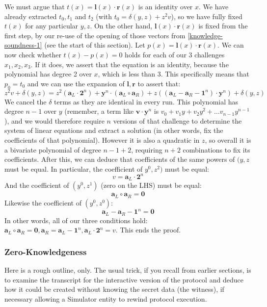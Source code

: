 \documentclass[10pt,a4paper]{article}
\begin{document}
We must argue that $t(x) = \textbf{l}(x) \cdot \textbf{r}(x)$ is an identity over $x$. We have already extracted $t_0, t_1$ and $t_2$
(with $t_0 = \delta(y, z) + z^2v$), so we have fully fixed $t(x)$ for any particular $y,z$. On the other hand, $\textbf{l}(x) \cdot \textbf{r}(x)$
is fixed from the first step, by our re-use of the opening of those
vectors from \ref{knowledge-soundness-1} (see the start of this section). Let $p(x) = \textbf{l}(x) \cdot \textbf{r}(x)$. We can now
check whether $t(x) -p(x) = 0$ holds for each of our 3 challenges $x_1, x_2, x_3$. If it does, we assert
that the equation is an identity, because the polynomial has degree 2
over $x$, which is less than 3. This specifically means that $p_0 = t_0$ and we can use
the expansion of $\mathbf{l}, \mathbf{r}$ to assert that:
\[z^2v + \delta(y, z) = z^2(\textbf{a}_L \cdot \textbf{2}^n) + \textbf{y}^n \cdot (\textbf{a}_L \circ \textbf{a}_R) + z((\textbf{a}_L - \textbf{a}_R - \textbf{1}^n) \cdot \textbf{y}^n) + \delta(y, z)\]
We cancel the $\delta$ terms as they are identical in every run. This polynomial
has degree $n-1$ over $y$ (remember, a term like $\textbf{v}\cdot\textbf{y}^n$ is $v_0 + v_1y + v_2y^2 + \ldots v_{n-1}y^{n-1}$), and we would therefore
require $n$ versions of that challenge to determine the system of linear
equations and extract a solution (in other words, fix the coefficients
of that polynomial). However it is also a quadratic in $z$, so overall it
is a bivariate polynomial of degree $n-1+2$, requiring $n+2$ combinations to fix its
coefficients. After this, we can deduce that coefficients of the same
powers of $(y,z$ must be equal. In particular, the coefficient of $y^0, z^2)$ must be
equal:
\[v =\textbf{a}_L \cdot \textbf{2}^n \]
And the coefficient of $(y^0, z^1)$ (zero on the LHS) must be equal:
\[\textbf{a}_L \circ \textbf{a}_R = \textbf{0}\]
Likewise the coefficient of $(y^0, z^0)$:
\[\textbf{a}_L - \textbf{a}_R -\textbf{1}^n = \textbf{0}\]
In other words, all of our three conditions hold: $\textbf{a}_L \circ \textbf{a}_R = \textbf{0}, \textbf{a}_R = \textbf{a}_L - \textbf{1}^n, \textbf{a}_L \cdot \textbf{2}^n = v$. This ends the proof.

\hypertarget{zero-knowledgeness-1}{%
\subsubsection[Zero-Knowledgeness]{\texorpdfstring{\protect\hypertarget{anchor-65}{}{}Zero-Knowledgeness}{Zero-Knowledgeness}}\label{zero-knowledgeness-1}}

Here is a rough outline, only. The usual trick, if you recall from
earlier sections, is to examine the transcript for the interactive
version of the protocol and deduce how it could be created without
knowing the secret data (the witness), if necessary allowing a Simulator
entity to rewind protocol execution.
\end{document}
